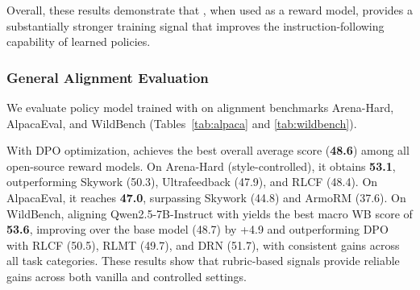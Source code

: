 Overall, these results demonstrate that {\name}, when used as a reward model, provides a substantially stronger training signal that improves the instruction-following capability of learned policies.








\subsubsection{General Alignment Evaluation}
We evaluate policy model trained with {\name} on alignment benchmarks Arena-Hard, AlpacaEval, and WildBench (Tables~\ref{tab:alpaca} and \ref{tab:wildbench}). 

With DPO optimization, {\name} achieves the best overall average score (\textbf{48.6}) among all open-source reward models. 
On Arena-Hard (style-controlled), it obtains \textbf{53.1}, outperforming Skywork (50.3), Ultrafeedback (47.9), and RLCF (48.4). 
On AlpacaEval, it reaches \textbf{47.0}, surpassing Skywork (44.8) and ArmoRM (37.6). 
On WildBench, aligning Qwen2.5-7B-Instruct with {\name} yields the best macro WB score of \textbf{53.6}, improving over the base model (48.7) by +4.9 and outperforming DPO with RLCF (50.5), RLMT (49.7), and DRN (51.7), with consistent gains across all task categories.
These results show that rubric-based signals provide reliable gains across both vanilla and controlled settings.

